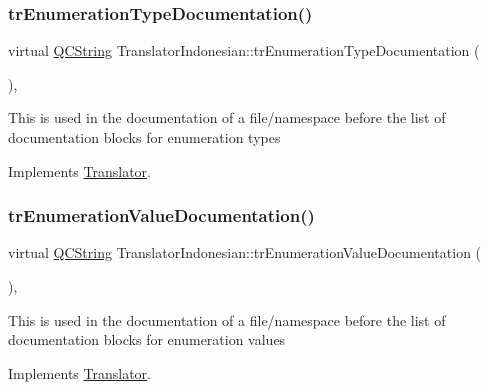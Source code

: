 \subsubsection{\texorpdfstring{trEnumerationTypeDocumentation()}{trEnumerationTypeDocumentation()}}
{\footnotesize\ttfamily virtual \mbox{\hyperlink{class_q_c_string}{Q\+C\+String}} Translator\+Indonesian\+::tr\+Enumeration\+Type\+Documentation (\begin{DoxyParamCaption}{ }\end{DoxyParamCaption})\hspace{0.3cm}{\ttfamily [inline]}, {\ttfamily [virtual]}}

This is used in the documentation of a file/namespace before the list of documentation blocks for enumeration types 

Implements \mbox{\hyperlink{class_translator}{Translator}}.

\mbox{\label{class_translator_indonesian_af1e251ffec041e91a4aae107ded06676}} 
\subsubsection{\texorpdfstring{trEnumerationValueDocumentation()}{trEnumerationValueDocumentation()}}
{\footnotesize\ttfamily virtual \mbox{\hyperlink{class_q_c_string}{Q\+C\+String}} Translator\+Indonesian\+::tr\+Enumeration\+Value\+Documentation (\begin{DoxyParamCaption}{ }\end{DoxyParamCaption})\hspace{0.3cm}{\ttfamily [inline]}, {\ttfamily [virtual]}}

This is used in the documentation of a file/namespace before the list of documentation blocks for enumeration values 

Implements \mbox{\hyperlink{class_translator}{Translator}}.

\mbox{\label{class_translator_indonesian_a93d8f9acaeb7a317f343b44c74482cae}} 
